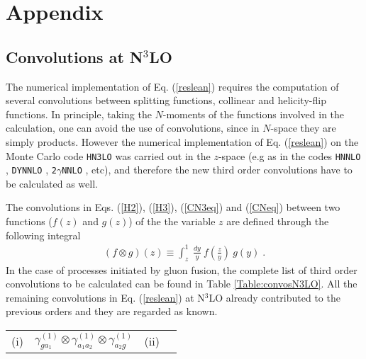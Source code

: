 \documentclass[12pt]{article}
\def\beeq{\begin{eqnarray}}
\def\eeeq{\end{eqnarray}}
\newcommand\f[2]{\frac{#1}{#2}}
\begin{document}
\section*{Appendix}
\begin{appendix}
\section{Convolutions at N$^{3}$LO}
\label{app:Convos}
The numerical implementation of Eq. (\ref{reslean}) requires the computation of several convolutions between splitting functions, collinear and helicity-flip functions. In principle, taking the $N$-moments of the functions involved in the calculation, one can avoid the use of convolutions, since in $N$-space they are simply products. However the numerical implementation of Eq. (\ref{reslean}) on the Monte Carlo code \texttt{HN3LO} was carried out in the $z$-space (e.g as in the codes \texttt{HNNLO} \cite{Catani:2007vq}, \texttt{DYNNLO} \cite{Catani:2009sm}, \texttt{2$\gamma$NNLO} \cite{Catani:2011qz}, etc), and therefore the new third order convolutions have to be calculated as well. 

The convolutions in Eqs. (\ref{H2}), (\ref{H3}), (\ref{CN3eq}) and (\ref{CNeq}) between two functions ($f(z)$ and $g(z)$) of the the variable $z$ are defined through the following integral
\beeq
\left( f \otimes g \right)(z) \equiv \int^{1}_{z}~\f{dy}{y}~f\left(\f{z}{y}\right)~g(y)\;.
\eeeq
In the case of processes initiated by gluon fusion, the complete list of third order convolutions to be calculated can be found in Table \ref{Table:convosN3LO}. All the remaining convolutions in Eq. (\ref{reslean}) at N$^{3}$LO already  contributed to the previous orders and they are regarded as known.
\begin{table}
\begin{center}
\renewcommand{\arraystretch}{1.5}
\begin{tabular}{ |c|c||c|c| }
\hline
\multirow{1}{*}{(i)} 

& $\gamma^{(1)}_{ga_{1}}\otimes\gamma^{(1)}_{a_{1} a_{2}}\otimes\gamma^{(1)}_{a_{2}g}$

& \multirow{1}{*}{(ii)} 


\end{tabular}
\end{center}
\end{table}
\end{appendix}
\end{document}
